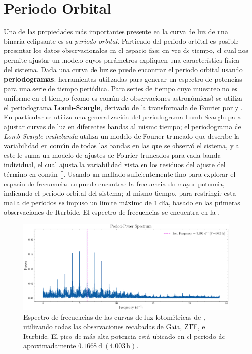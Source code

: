 \chapter{Periodo Orbital} \label{metodologia:analisisperiodo}

Una de las propiedades más importantes presente en la curva de luz de una
binaria eclipsante es su \textit{periodo orbital}. Partiendo del periodo orbital
es posible presentar los datos observacionales en el espacio fase en vez de
tiempo, el cual nos permite ajustar un modelo cuyos parámetros expliquen una
característica física del sistema. Dada una curva de luz se puede encontrar el
periodo orbital usando \textbf{periodogramas}: herramientas utilizadas para
generar un espectro de potencias para una serie de tiempo periódica. Para series
de tiempo cuyo muestreo no es uniforme en el tiempo (como es común de
observaciones astronómicas) se utiliza el periodograma \textbf{Lomb-Scargle},
derivado de la transformada de Fourier por
 y
. En particular se
utiliza una generalización del periodograma Lomb-Scargle para
ajustar curvas de luz en diferentes bandas al mismo tiempo; el periodograma de
\textit{Lomb-Scargle multibanda} utiliza un modelo de Fourier truncado que
describe la variabilidad en común de todas las bandas en las que se observó el
sistema, y a este le suma un modelo de ajustes de Fourier truncados para cada
banda individual, el cual ajusta la variabilidad vista en los residuos del
ajuste del término en común
[]. Usando un
mallado suficientemente fino para explorar el espacio de frecuencias se puede
encontrar la frecuencia de mayor potencia, indicando el periodo orbital del
sistema; al mismo tiempo, para restringir esta malla de periodos se impuso un
límite máximo de 1 día, basado en las primeras observaciones de Iturbide. El
espectro de frecuencias se encuentra en la . 

\begin{figure}[!ht]
	\centering
	\includegraphics[scale=0.45]{Metodologia/Secciones/AnalisisPeriodo/Figures/LS Power Spectrum.png}
	
	\caption{Espectro de frecuencias de las curvas de luz fotométricas de
	\atoObjIdNoSpace, utilizando todas las observaciones recabadas de Gaia, ZTF,
	e Iturbide. El pico de más alta potencia está ubicado en el periodo de
	aproximadamente $0.1668 \ \mathrm{d} \ (4.003 \ \mathrm{h})$.} 
	\label{periodogramaLSFrecs}
\end{figure}

